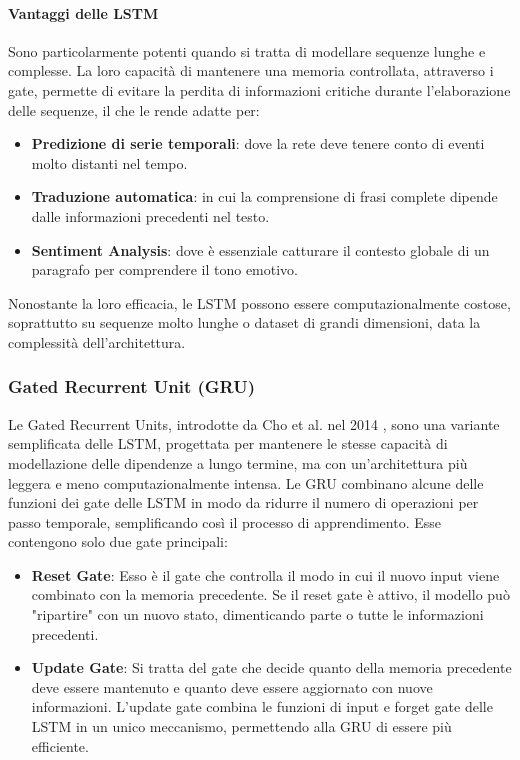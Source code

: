 \paragraph{Vantaggi delle LSTM}
Sono particolarmente potenti quando si tratta di modellare sequenze lunghe e complesse. La loro capacità di mantenere una memoria controllata, attraverso i gate, permette di evitare la perdita di informazioni critiche durante l'elaborazione delle sequenze, il che le rende adatte per:
\begin{itemize}
	\item \textbf{Predizione di serie temporali}: dove la rete deve tenere conto di eventi molto distanti nel tempo.
	\item \textbf{Traduzione automatica}: in cui la comprensione di frasi complete dipende dalle informazioni precedenti nel testo.
	\item \textbf{Sentiment Analysis}: dove è essenziale catturare il contesto globale di un paragrafo per comprendere il tono emotivo.
\end{itemize}
Nonostante la loro efficacia, le LSTM possono essere computazionalmente costose, soprattutto su sequenze molto lunghe o dataset di grandi dimensioni, data la complessità dell'architettura.

\subsubsection{Gated Recurrent Unit (GRU)}
Le Gated Recurrent Units, introdotte da Cho et al. nel 2014 \cite{chung2014empiricalevaluationgatedrecurrent}, sono una variante semplificata delle LSTM, progettata per mantenere le stesse capacità di modellazione delle dipendenze a lungo termine, ma con un'architettura più leggera e meno computazionalmente intensa. Le GRU combinano alcune delle funzioni dei gate delle LSTM in modo da ridurre il numero di operazioni per passo temporale, semplificando così il processo di apprendimento.
Esse contengono solo due gate principali:
\begin{itemize}
	\item \textbf{Reset Gate}: Esso è il gate che controlla il modo in cui il nuovo input viene combinato con la memoria precedente. Se il reset gate è attivo, il modello può "ripartire" con un nuovo stato, dimenticando parte o tutte le informazioni precedenti.
	\item \textbf{Update Gate}: Si tratta del gate che decide quanto della memoria precedente deve essere mantenuto e quanto deve essere aggiornato con nuove informazioni. L'update gate combina le funzioni di input e forget gate delle LSTM in un unico meccanismo, permettendo alla GRU di essere più efficiente.
\end{itemize}

